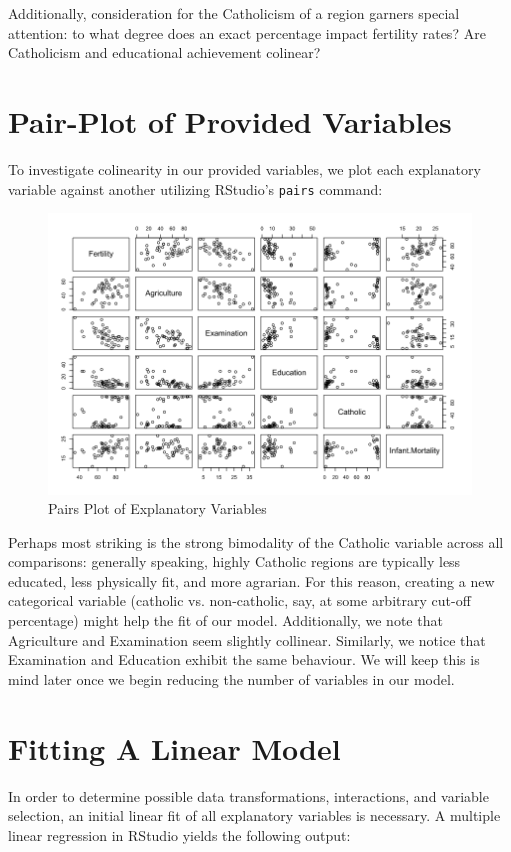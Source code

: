 \documentclass[preprint,12pt]{elsarticle}
\begin{document}
\noindent Additionally, consideration for the Catholicism of a region garners special attention: to what degree does an exact percentage impact fertility rates? Are Catholicism and educational achievement colinear? 

\section*{Pair-Plot of Provided Variables}

\noindent To investigate colinearity in our provided variables, we plot each explanatory variable against another utilizing RStudio's \texttt{pairs} command:

\begin{figure}[h]
\centering\includegraphics[width=0.8\linewidth]{Pairs}
\caption{Pairs Plot of Explanatory Variables}
\end{figure}

\noindent Perhaps most striking is the strong bimodality of the Catholic variable across all comparisons: generally speaking, highly Catholic regions are typically less educated, less physically fit, and more agrarian. For this reason, creating a new categorical variable (catholic vs. non-catholic, say, at some arbitrary cut-off percentage) might help the fit of our model. Additionally, we note that Agriculture and Examination seem  slightly collinear. Similarly, we notice that Examination and Education exhibit the same behaviour. We will keep this is mind later once we begin reducing the number of variables in our model.

\section*{Fitting A Linear Model}

\noindent In order to determine possible data transformations, interactions, and variable selection, an initial linear fit of all explanatory variables is necessary. A multiple linear regression in RStudio yields the following output: \newpage
\end{document}
